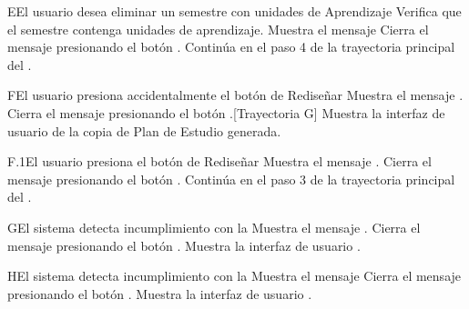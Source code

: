 \begin{UCtrayectoriaA}{E}{El usuario desea eliminar un semestre con unidades de Aprendizaje}
	\UCpaso Verifica que el semestre contenga unidades de aprendizaje.
	\UCpaso Muestra el mensaje 
	\UCpaso[\UCactor] Cierra el mensaje presionando el botón .
	\UCpaso Continúa en el paso 4 de la trayectoria principal del .
\end{UCtrayectoriaA}

\begin{UCtrayectoriaA}{F}{El usuario presiona accidentalmente el botón \BtnLapiz de Rediseñar}
	\UCpaso  Muestra el mensaje .
	\UCpaso[\UCactor] Cierra el mensaje presionando el botón .[Trayectoria G]
	\UCpaso Muestra la interfaz de usuario  de la copia de Plan de Estudio generada.
\end{UCtrayectoriaA}
\begin{UCtrayectoriaA}{F.1}{El usuario presiona el botón \BtnLapiz de Rediseñar}
	\UCpaso  Muestra el mensaje .
	\UCpaso[\UCactor] Cierra el mensaje presionando el botón .
	\UCpaso Continúa en el paso 3 de la trayectoria principal del .
\end{UCtrayectoriaA}

\begin{UCtrayectoriaA}{G}{El sistema detecta incumplimiento con la  }
	\UCpaso Muestra el mensaje .
	\UCpaso[\UCactor] Cierra el mensaje presionando el botón .
	\UCpaso Muestra la interfaz de usuario .
\end{UCtrayectoriaA}

\begin{UCtrayectoriaA}{H}{El sistema detecta incumplimiento con la  }
	\UCpaso Muestra el mensaje 
	\UCpaso[\UCactor] Cierra el mensaje presionando el botón .
	\UCpaso Muestra la interfaz de usuario .
\end{UCtrayectoriaA}
